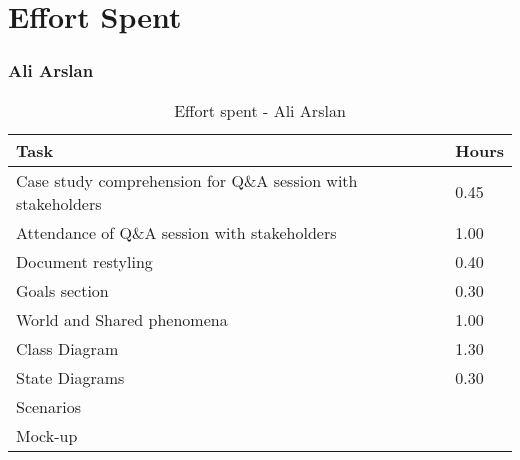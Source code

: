 \chapter{Effort Spent}

\subsection{Ali Arslan}
\renewcommand{\arraystretch}{2}
\begin{longtable}{|m{9cm}|m{1.2cm}|}
\caption{Effort spent - Ali Arslan}\\
\hline
\endfirsthead
\endhead
\hline
\endlastfoot
\rowcolor{green2}
\textbf{Task} & \hfil {\textbf{Hours}}\\
\hline
Case study comprehension for Q\&A session with stakeholders & \hfil 0.45\\
Attendance of Q\&A session with stakeholders & \hfil 1.00\\
Document restyling	& \hfil 0.40\\
Goals section & \hfil 0.30\\
World and Shared phenomena & \hfil 1.00\\
Class Diagram & \hfil 1.30\\
State Diagrams & \hfil 0.30\\
Scenarios & \hfil \\
Mock-up  & \hfil \\
\hline
\end{longtable}

